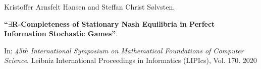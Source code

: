 Kristoffer Arnsfelt Hansen and Steffan Christ Sølvsten.

{\bf ``$\exists$R-Completeness of Stationary Nash Equilibria in Perfect
  Information Stochastic Games''}.

In: \emph{45th International Symposium on Mathematical Foundations of Computer
  Science}. Leibniz International Proceedings in Informatics (LIPIcs), Vol. 170.
2020

\label{cite:2020.mfcs}